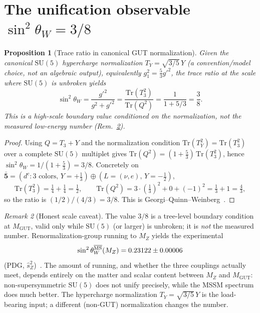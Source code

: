 \documentclass[aps,prresearch,onecolumn,amsmath,amssymb,nofootinbib]{revtex4-2}
\theoremstyle{plain}\newtheorem{theorem}{Theorem}[section]\newtheorem{proposition}[theorem]{Proposition}\newtheorem{lemma}[theorem]{Lemma}\newtheorem{corollary}[theorem]{Corollary}
\theoremstyle{definition}\newtheorem{definition}[theorem]{Definition}\newtheorem{conjecture}[theorem]{Conjecture}
\theoremstyle{remark}\newtheorem{remark}[theorem]{Remark}
\begin{document}
\section{The unification observable $\sin^2\theta_W=3/8$}
\label{sec:F4}

\begin{proposition}[Trace ratio in canonical GUT normalization]
\label{thm:weinberg}
\emph{Given} the canonical $\mathrm{SU}(5)$ hypercharge normalization $T_Y=\sqrt{3/5}\,Y$ (a convention/model choice, not an algebraic output), equivalently $g_1^2=\tfrac53 g'^2$, the trace ratio at the scale where $\mathrm{SU}(5)$ is unbroken yields
\begin{equation}
\sin^2\theta_W=\frac{g'^2}{g^2+g'^2}=\frac{\mathrm{Tr}(T_3^2)}{\mathrm{Tr}(Q^2)}=\frac{1}{1+5/3}=\frac{3}{8}.
\end{equation}
This is a high-scale boundary value conditioned on the normalization, not the measured low-energy number (Rem.~\ref{rem:running}).
\end{proposition}

\begin{proof}
Using $Q=T_3+Y$ and the normalization condition $\mathrm{Tr}(T_Y^2)=\mathrm{Tr}(T_3^2)$ over a complete $\mathrm{SU}(5)$ multiplet gives $\mathrm{Tr}(Q^2)=(1+\tfrac53)\,\mathrm{Tr}(T_3^2)$, hence $\sin^2\theta_W=1/(1+\tfrac53)=3/8$. Concretely on $\bar{\mathbf 5}=(d^c:\text{3 colors},\,Y=+\tfrac13)\oplus(L=(\nu,e),\,Y=-\tfrac12)$,
\begin{equation}
\mathrm{Tr}(T_3^2)=\tfrac14+\tfrac14=\tfrac12,\qquad
\mathrm{Tr}(Q^2)=3\cdot(\tfrac13)^2+0+(-1)^2=\tfrac13+1=\tfrac43,
\end{equation}
so the ratio is $(1/2)/(4/3)=3/8$. This is Georgi--Quinn--Weinberg~\cite{GeorgiQuinnWeinberg1974}.
\end{proof}

\begin{remark}[Honest scale caveat]
\label{rem:running}
The value $3/8$ is a tree-level boundary condition at $M_\text{GUT}$, valid only while $\mathrm{SU}(5)$ (or larger) is unbroken; it is \emph{not} the measured number. Renormalization-group running to $M_Z$ yields the experimental
\begin{equation}
\sin^2\theta_W^{\overline{\rm MS}}(M_Z)=0.23122\pm0.00006
\end{equation}
(PDG, $\hat s_Z^2$)~\cite{PDG2024}. The amount of running, and whether the three couplings actually meet, depends entirely on the matter and scalar content between $M_Z$ and $M_\text{GUT}$: non-supersymmetric $\mathrm{SU}(5)$ does not unify precisely, while the MSSM spectrum does much better. The hypercharge normalization $T_Y=\sqrt{3/5}\,Y$ is the load-bearing input; a different (non-GUT) normalization changes the number.
\end{remark}
\end{document}
